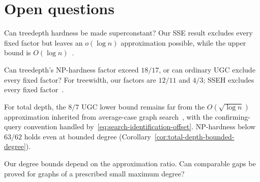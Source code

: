 \section{Open questions}
\label{sec:conclusion}

Can treedepth hardness be made superconstant? Our SSE result excludes
every fixed factor but leaves an $o(\log n)$ approximation possible,
while the upper bound is $O(\log n)$~\cite{Anand2026}.

Can treedepth's NP-hardness factor exceed $18/17$, or can ordinary
UGC exclude every fixed factor? For treewidth, our factors are
$12/11$ and $4/3$; SSEH excludes every fixed factor~\cite{APW}.

For total depth, the $8/7$ UGC lower bound remains far from the
$O(\sqrt{\log n})$ approximation inherited from average-case graph
search~\cite{Szyfelbein2025GraphSearch}, with the confirming-query
convention handled by~\eqref{eq:search-identification-offset}.
NP-hardness below $63/62$
holds even at bounded degree
(Corollary~\ref{cor:total-depth-bounded-degree}).

Our degree bounds depend on the approximation ratio. Can comparable
gaps be proved for graphs of a prescribed small maximum degree?
